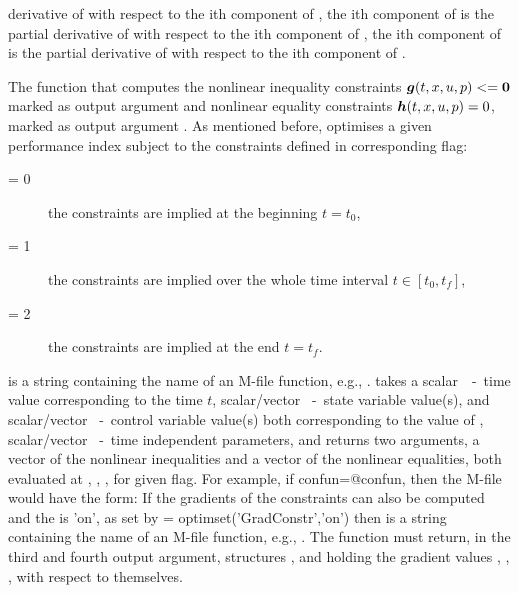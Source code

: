 \begin{description}
   derivative of  with respect to the ith component of
   , the ith component of  is the partial
   derivative of  with respect to the ith component of
   , the ith component of  is the partial
   derivative of  with respect to the ith component of
   .  
\item[\argfun{confun}] The function that computes the nonlinear
  inequality constraints $\ve{g}(t,x,u,p)<=\ve{0}$ marked as output
  argument  and nonlinear equality constraints
  $\ve{h}(t,x,u,p)=0$, marked as output argument . As
  mentioned before,  optimises a given performance index
  subject to the constraints defined in corresponding flag:
  \begin{description}
  \item[ = 0] the constraints are implied at the
    beginning $t = t_{0}$,
  \item[ = 1] the constraints are implied over the whole
    time interval $t \in [t_{0},t_{f}]$,
  \item[ = 2] the constraints are implied at the end $t
  = t_{f}$.
  \end{description}
   is a string containing the name of an M-file
  function, e.g., .  takes a
  scalar~~-~time value corresponding to the time $t$,
  scalar/vec\-tor ~-~state variable value(s), and
  scalar/vector ~-~control variable value(s) both
  corresponding to the value of , scalar/vector
  ~-~time independent parameters, and returns two arguments,
  a vector  of the nonlinear inequalities and a vector
   of the nonlinear equalities, both evaluated at
  , , ,  for given flag. For
  example, if confun=@confun, then the M-file  would
  have the form: 
  {\small }
  If the gradients of the constraints can also be computed and the
   is 'on', as set by  =
  optimset('GradConstr','on') then  is a string
  containing the name of an M-file function, e.g.,
  . The function  must return, in the
  third and fourth output argument, structures , and
   holding the gradient values , ,
  ,  with respect to themselves. 
  {\small }

\end{description}
